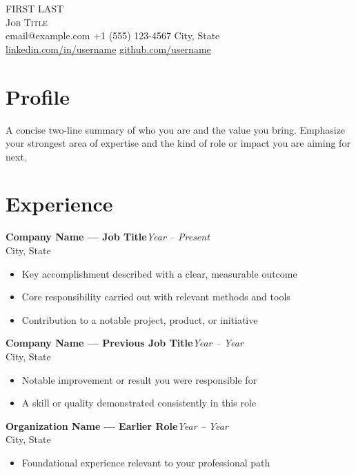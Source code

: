 \documentclass[11pt, letterpaper]{article}
\newcommand{\entry}[3]{%
    {\bfseries #1}\hfill{\itshape #2}\\
    #3\par\vspace{1pt}
}
\begin{document}
\begin{center}
    {\fontsize{26}{30}\selectfont FIRST LAST}\\[6pt]
    {\scshape\large Job Title}\\[8pt]
    {\small email@example.com \quad\textbullet\quad +1 (555) 123-4567 \quad\textbullet\quad City, State}\\[2pt]
    {\small \href{https://linkedin.com/in/username}{linkedin.com/in/username} \quad\textbullet\quad \href{https://github.com/username}{github.com/username}}
\end{center}

\vspace{6pt}

\section{Profile}
A concise two-line summary of who you are and the value you bring. Emphasize your strongest area of expertise and the kind of role or impact you are aiming for next.

\section{Experience}
\entry{Company Name --- Job Title}{Year -- Present}{City, State}
\begin{itemize}
    \item Key accomplishment described with a clear, measurable outcome
    \item Core responsibility carried out with relevant methods and tools
    \item Contribution to a notable project, product, or initiative
\end{itemize}

\vspace{6pt}
\entry{Company Name --- Previous Job Title}{Year -- Year}{City, State}
\begin{itemize}
    \item Notable improvement or result you were responsible for
    \item A skill or quality demonstrated consistently in this role
\end{itemize}

\vspace{6pt}
\entry{Organization Name --- Earlier Role}{Year -- Year}{City, State}
\begin{itemize}
    \item Foundational experience relevant to your professional path
\end{itemize}
\end{document}
